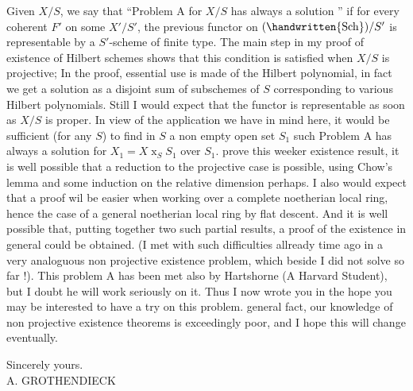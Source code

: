 Given $X/S$, we say that ``Problem A for $X/S$ has always a solution '' if for every coherent $F'$ on some $X'/S'$, the previous functor on $(\handwritten{\mathrm{Sch}})/S'$ is representable by a $S'$-scheme of finite type. The main step in my proof of existence of Hilbert schemes shows that this condition is satisfied when $X/S$ is projective; In the proof, essential use is made of the Hilbert polynomial, in fact we get a solution as a disjoint sum of subschemes of $S$ corresponding to various Hilbert polynomials. Still I would expect that the functor is representable as soon as $X/S$ is proper. In view of the application we have in mind here, it would be sufficient (for any  $S$) to find in $S$ a non empty open set $S_{1}$ such Problem A has always a solution for $X_{1}=X\mathbin{x}_{S}S_{1}$ over $S_{1}$.  prove this weeker existence result, it is well possible that a reduction to the projective case is possible, using Chow's lemma and some induction on the relative dimension perhaps. I also would expect that a proof wil be easier when working over a complete noetherian local ring, hence the case of a general noetherian local ring by flat descent. And it is well possible that, putting together two such partial results, a proof of the existence in general could be obtained. (I met with such difficulties allready time ago in a very analoguous non projective existence problem, which beside I did not solve so far !). This problem A has been met also by Hartshorne (A Harvard Student), but I doubt he will work seriously on it. Thus I now wrote you in the hope you may be interested to have a try on this problem.  general fact, our knowledge of non projective existence theorems is exceedingly poor, and I hope this will change eventually.

Sincerely yours.\\

A. GROTHENDIECK\\

